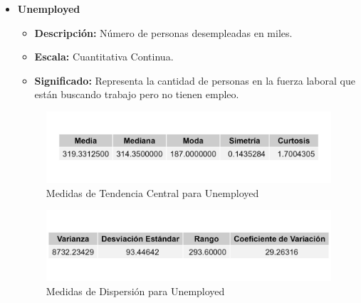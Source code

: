 \documentclass{article}
\begin{document}
\begin{itemize}
    \item \textbf{Unemployed}
    \begin{itemize}
        \item \textbf{Descripción:} Número de personas desempleadas en miles.
        \item \textbf{Escala:} Cuantitativa Continua.
        \item \textbf{Significado:} Representa la cantidad de personas en la fuerza laboral que están buscando trabajo pero no tienen empleo.
    \end{itemize}
    \begin{figure}[H]
        \centering
        \includegraphics[width=\textwidth]{MTC/Unemployed_central.png}
        \caption{Medidas de Tendencia Central para Unemployed}
    \end{figure}
    \begin{figure}[H]
        \centering
        \includegraphics[width=\textwidth]{MTC/Unemployed_dispersion.png}
        \caption{Medidas de Dispersión para Unemployed}
    \end{figure}
    

\end{itemize}
\end{document}
